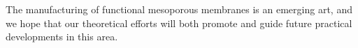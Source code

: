 \documentclass[12pt, a4paper]{article}
\begin{document}
The manufacturing of functional mesoporous membranes is an emerging art, and we hope that our theoretical efforts will both promote and guide future practical developments in this area. 




\end{document}
